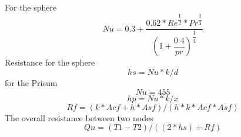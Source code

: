 \documentclass[compileTAMUreport.tex]{subfiles}
\begin{document}
For the sphere
\begin{equation}
Nu = 0.3 + \dfrac{0.62*Re^{\dfrac{1}{2}}*Pr^{\dfrac{1}{3}}}{\left( 1+{{\dfrac{0.4}{pr}}}\right) ^{\dfrac{1}{4}}  } 
\end{equation}
Resistance for the sphere
\begin{equation}
hs=Nu*k/d
\end{equation}
for the Prisum
\begin{equation}
Nu=455 %
\end{equation}
\begin{equation}
hp=Nu*k/x
\end{equation}
\begin{equation}
Rf={\left(k*Acf+h*Asf\right)}/{\left(h*k*Acf*Asf\right)}
\end{equation}
The overall resistance between two nodes
\begin{equation}
Qn={\left(T1-T2\right)}/{\left({\left(2*hs\right)+Rf}\right)}
\end{equation}
\end{document}
